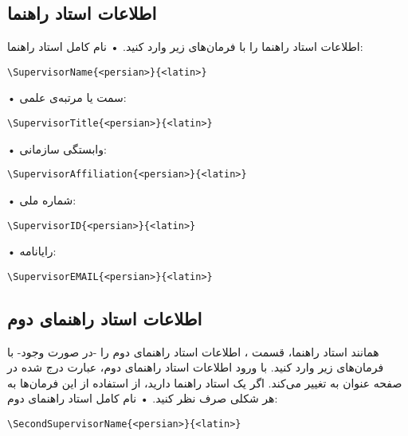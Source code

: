 \documentclass[%
12pt,%
twoside, %
openany, %
notitlepage,%
fleqn,%
]{article}
\numberwithin{equation}{section} %
\begin{document}
\subsection{اطلاعات استاد راهنما} \label{SupInf}
اطلاعات استاد راهنما را با فرمان‌های زیر وارد کنید\@. 
• نام کامل استاد راهنما:
\begin{latin}\begin{verbatim}
\SupervisorName{<persian>}{<latin>}
\end{verbatim} \end{latin}
• سمت یا مرتبه‌ی علمی:
\begin{latin}\begin{verbatim}
\SupervisorTitle{<persian>}{<latin>}
\end{verbatim} \end{latin}
• وابستگی سازمانی:
\begin{latin}\begin{verbatim}
\SupervisorAffiliation{<persian>}{<latin>}
\end{verbatim} \end{latin}
• شماره ملی:
\begin{latin}\begin{verbatim}
\SupervisorID{<persian>}{<latin>}
\end{verbatim} \end{latin}
• رایانامه:
\begin{latin}\begin{verbatim}
\SupervisorEMAIL{<persian>}{<latin>}
\end{verbatim} \end{latin}
\subsection{اطلاعات استاد راهنمای دوم}
همانند استاد راهنما، قسمت ، اطلاعات استاد راهنمای دوم را -در صورت وجود- با فرمان‌های زیر وارد کنید\@. با ورود اطلاعات استاد راهنمای دوم، عبارت  درج شده در صفحه عنوان به  تغییر می‌کند\@. اگر یک استاد راهنما دارید، از استفاده از این فرمان‌ها به هر شکلی صرف نظر کنید\@. 
• نام کامل استاد راهنمای دوم:
\begin{latin}\begin{verbatim}
\SecondSupervisorName{<persian>}{<latin>}
\end{verbatim} \end{latin}
\end{document}
